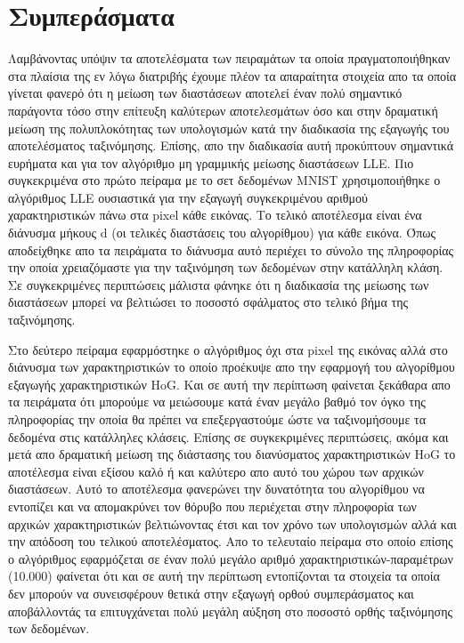 \chapter{Συμπεράσματα}
\par
Λαμβάνοντας υπόψιν τα αποτελέσματα των πειραμάτων τα οποία πραγματοποιήθηκαν στα πλαίσια της εν λόγω διατριβής έχουμε πλέον τα απαραίτητα στοιχεία απο τα οποία γίνεται φανερό ότι η μείωση των διαστάσεων αποτελεί έναν πολύ σημαντικό παράγοντα τόσο στην επίτευξη καλύτερων αποτελεσμάτων όσο και στην δραματική μείωση της πολυπλοκότητας των υπολογισμών κατά την διαδικασία της εξαγωγής του αποτελέσματος ταξινόμησης. Επίσης, απο την διαδικασία αυτή προκύπτουν σημαντικά ευρήματα και για τον αλγόριθμο μη γραμμικής μείωσης διαστάσεων \textlatin{LLE}. Πιο συγκεκριμένα στο πρώτο πείραμα με το σετ δεδομένων \textlatin{MNIST} χρησιμοποιήθηκε ο αλγόριθμος \textlatin{LLE} ουσιαστικά για την εξαγωγή συγκεκριμένου αριθμού χαρακτηριστικών πάνω στα \textlatin{pixel} κάθε εικόνας. Το τελικό αποτέλεσμα είναι ένα διάνυσμα μήκους \textlatin{d} (οι τελικές διαστάσεις του αλγορίθμου) για κάθε εικόνα. Όπως αποδείχθηκε απο τα πειράματα το διάνυσμα αυτό περιέχει το σύνολο της πληροφορίας την οποία χρειαζόμαστε για την ταξινόμηση των δεδομένων στην κατάλληλη κλάση. Σε συγκεκριμένες περιπτώσεις μάλιστα φάνηκε ότι η διαδικασία της μείωσης των διαστάσεων μπορεί να βελτιώσει το ποσοστό σφάλματος στο τελικό βήμα της ταξινόμησης. 
\par
Στο δεύτερο πείραμα εφαρμόστηκε ο αλγόριθμος όχι στα \textlatin{pixel} της εικόνας αλλά στο διάνυσμα των χαρακτηριστικών το οποίο προέκυψε απο την εφαρμογή του αλγορίθμου εξαγωγής χαρακτηριστικών \textlatin{HoG}. Και σε αυτή την περίπτωση φαίνεται ξεκάθαρα απο τα πειράματα ότι μπορούμε να μειώσουμε κατά έναν μεγάλο βαθμό τον όγκο της πληροφορίας την οποία θα πρέπει να επεξεργαστούμε ώστε να ταξινομήσουμε τα δεδομένα στις κατάλληλες κλάσεις. Επίσης σε συγκεκριμένες περιπτώσεις, ακόμα και μετά απο δραματική μείωση της διάστασης του διανύσματος χαρακτηριστικών \textlatin{HoG} το αποτέλεσμα είναι εξίσου καλό ή και καλύτερο απο αυτό του χώρου των αρχικών διαστάσεων. Αυτό το αποτέλεσμα φανερώνει την δυνατότητα του αλγορίθμου να εντοπίζει και να απομακρύνει τον θόρυβο που περιέχεται στην πληροφορία των αρχικών χαρακτηριστικών βελτιώνοντας έτσι και τον χρόνο των υπολογισμών αλλά και την απόδοση του τελικού αποτελέσματος. Απο το τελευταίο πείραμα στο οποίο επίσης ο αλγόριθμος εφαρμόζεται σε έναν πολύ μεγάλο αριθμό χαρακτηριστικών-παραμέτρων (10.000) φαίνεται ότι και σε αυτή την περίπτωση εντοπίζονται τα στοιχεία τα οποία δεν μπορούν να συνεισφέρουν θετικά στην εξαγωγή ορθού συμπεράσματος και αποβάλλοντάς τα επιτυγχάνεται πολύ μεγάλη αύξηση στο ποσοστό ορθής ταξινόμησης των δεδομένων.
